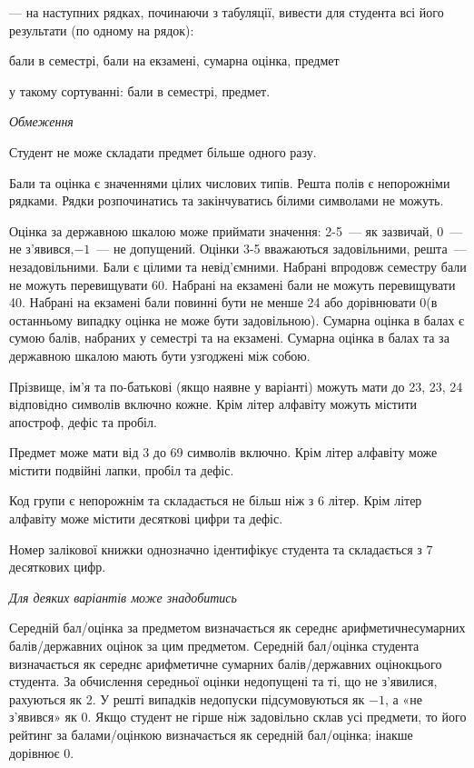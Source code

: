 \documentclass[11pt, ukrainian]{article}
\begin{document}
{\noindent}--- на наступних рядках, починаючи з табуляції, вивести для студента всі його результати (по одному на рядок):\par
бали в семестрі, бали на екзамені, сумарна оцінка, предмет

{\noindent}у такому сортуванні: бали в семестрі, предмет.


\bigskip\textit{Обмеження}

Студент не може складати предмет більше одного разу.

Бали та оцінка є значеннями цілих числових типів. Решта полів є непорожніми рядками.
Рядки розпочинатись та закінчуватись білими символами не можуть.

Оцінка за державною шкалою може приймати значення: 2-5~--- як зазвичай, 0~--- не з’явився,$-1$~--- не допущений. 
Оцінки 3-5 вважаються задовільними, решта~--- незадовільними. 
Бали є цілими та невід’ємними.
Набрані впродовж семестру бали не можуть перевищувати 60. 
Набрані на екзамені бали не можуть перевищувати 40. 
Набрані на екзамені бали повинні бути не менше 24 або дорівнювати 0(в останньому випадку оцінка не може бути задовільною). 
Сумарна оцінка в балах є сумою балів, набраних у семестрі та на екзамені.
Сумарна оцінка в балах та за державною шкалою мають бути узгоджені між собою.

Прізвище, ім’я та по-батькові (якщо наявне у варіанті) можуть мати до 23, 23, 24 відповідно символів включно кожне. 
Крім літер алфавіту можуть містити апостроф, дефіс та пробіл.

Предмет може мати від 3 до 69 символів включно. 
Крім літер алфавіту може містити подвійні лапки, пробіл та дефіс.

Код групи є непорожнім та складається не більш ніж з 6 літер. 
Крім літер алфавіту може містити десяткові цифри та дефіс.


Номер залікової книжки однозначно ідентифікує студента та складається з 7 десяткових цифр. 

\bigskip\textit{Для деяких варіантів може знадобитись}

Середній бал/оцінка за предметом визначається як середнє арифметичнесумарних балів/державних оцінок за цим предметом. 
Середній бал/оцінка студента визначається як середнє арифметичне сумарних балів/державних оцінокцього студента. 
За обчислення середньої оцінки недопущені та ті, що не з’явилися, рахуються як 2.
У решті випадків недопуски підсумовуються як $-1$, а «не з’явився» як 0.
Якщо студент не гірше ніж задовільно склав усі предмети, 
то його рейтинг за балами/оцінкою визначається як середній бал/оцінка; інакше дорівнює 0.
\end{document}
